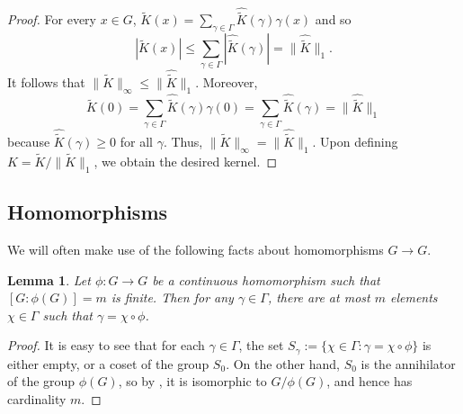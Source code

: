 \documentclass[10pt]{article}
\newtheorem{lemma}[lemma]{Lemma}
\theoremstyle{definition}
\begin{document}
\begin{proof}
    For every $x \in G$, $\widetilde{K}(x) = \sum_{\gamma \in \Gamma} \widehat{\widetilde{K}}(\gamma) \gamma(x)$ and so 
\[
    |\widetilde{K}(x)| \leq \sum_{\gamma \in \Gamma} |\widehat{\widetilde{K}}(\gamma)| = \lVert \widehat{\widetilde{K}} \rVert_1.
\]
It follows that $\lVert \widetilde{K} \rVert_{\infty} \leq \lVert \widehat{\widetilde{K}} \rVert_1$.
Moreover,
\[
    \widetilde{K}(0) = \sum_{\gamma \in \Gamma} \widehat{\widetilde{K}}(\gamma) \gamma(0) = \sum_{\gamma \in \Gamma} \widehat{\widetilde{K}}(\gamma) = \lVert \widehat{\widetilde{K}} \rVert_1
\]
because $\widehat{\widetilde{K}}(\gamma) \geq 0$ for all $\gamma$. Thus, $\lVert \widetilde{K} \rVert_{\infty} = \lVert \widehat{\widetilde{K}} \rVert_1$. Upon defining $K = \widetilde{K}/\lVert \widetilde{K} \rVert_{1}$,
    we obtain the desired kernel.
\end{proof}


\subsection{Homomorphisms} We will often make use of the following facts about homomorphisms $G \rightarrow G$.

\begin{lemma}\label{lem:homo-solutions}
Let $\phi: G \rightarrow G$ be a continuous homomorphism such that $[G:\phi(G)] = m$ is finite. Then for any $\gamma \in \Gamma$, there are at most $m$ elements $\chi \in \Gamma$ such that $\gamma = \chi \circ \phi$.
\end{lemma}
\begin{proof}
It is easy to see that for each $\gamma \in \Gamma$, the set $S_\gamma := \{ \chi \in \Gamma : \gamma = \chi \circ \phi\}$ is either empty, or a coset of the group $S_0$. On the other hand, $S_0$ is the annihilator of the group $\phi(G)$, so by \cite[Theorem 2.1.2]{rudin}, it is isomorphic to $G/\phi(G)$, and hence has cardinality $m$.
\end{proof}
\end{document}
